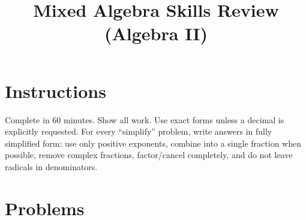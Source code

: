 \documentclass[12pt]{article}
\title{Mixed Algebra Skills Review (Algebra II)}
\author{}
\date{}
\begin{document}
\maketitle

\section*{Instructions}
Complete in 60 minutes. Show all work. Use exact forms unless a decimal is explicitly requested. For every ``simplify'' problem, write answers in fully simplified form: use only positive exponents, combine into a single fraction when possible, remove complex fractions, factor/cancel completely, and do not leave radicals in denominators.

\section*{Problems}
\end{document}
